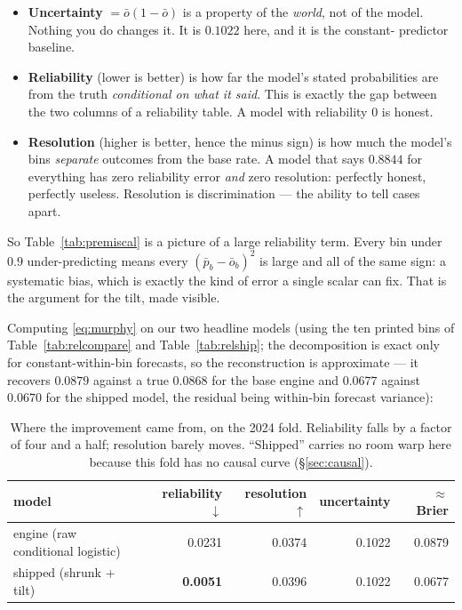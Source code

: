 \documentclass[10pt,a4paper]{article}
\theoremstyle{plain}
\theoremstyle{definition}
\theoremstyle{remark}
\begin{document}
\begin{itemize}
\item \textbf{Uncertainty} $= \bar o(1-\bar o)$ is a property of the \emph{world}, not of
the model. Nothing you do changes it. It is $0.1022$ here, and it is the constant-
predictor baseline.
\item \textbf{Reliability} (lower is better) is how far the model's stated probabilities
are from the truth \emph{conditional on what it said}. This is exactly the gap between
the two columns of a reliability table. A model with reliability $0$ is honest.
\item \textbf{Resolution} (higher is better, hence the minus sign) is how much the
model's bins \emph{separate} outcomes from the base rate. A model that says $0.8844$ for
everything has zero reliability error \emph{and} zero resolution: perfectly honest,
perfectly useless. Resolution is discrimination --- the ability to tell cases apart.
\end{itemize}

So Table~\ref{tab:premiscal} is a picture of a large reliability term. Every bin under
$0.9$ under-predicting means every $(\bar p_b - \bar o_b)^2$ is large and all of the
same sign: a systematic bias, which is exactly the kind of error a single scalar can fix.
That is the argument for the tilt, made visible.

Computing \eqref{eq:murphy} on our two headline models (using the ten printed bins of
Table~\ref{tab:relcompare} and Table~\ref{tab:relship}; the decomposition is exact only for
constant-within-bin forecasts, so the reconstruction is approximate --- it recovers
$0.0879$ against a true $0.0868$ for the base engine and $0.0677$ against $0.0670$ for the
shipped model, the residual being within-bin forecast variance):

\begin{table}[htbp]
\centering
\small
\begin{tabular}{lrrrr}
\toprule
model & reliability $\downarrow$ & resolution $\uparrow$ & uncertainty & $\approx$ Brier \\
\midrule
engine (raw conditional logistic) & 0.0231 & 0.0374 & 0.1022 & 0.0879 \\
shipped (shrunk + tilt) & \textbf{0.0051} & 0.0396 & 0.1022 & 0.0677 \\
\bottomrule
\end{tabular}
\caption{Where the improvement came from, on the 2024 fold. Reliability falls by a factor
of four and a half; resolution barely moves. ``Shipped'' carries no room warp here because
this fold has no causal curve (\S\ref{sec:causal}).}
\label{tab:murphy}
\end{table}
\end{document}
